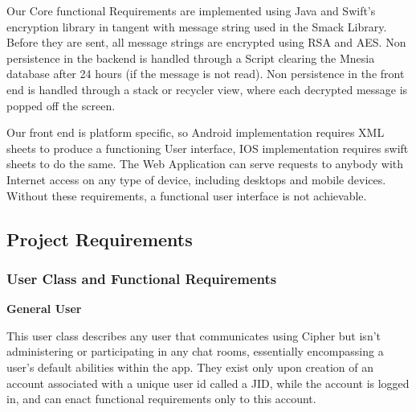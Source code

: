 \documentclass[12pt]{article}
\begin{document}
Our Core functional Requirements are implemented using Java and Swift’s encryption library in tangent with message string used in the Smack Library. Before they are sent, all message strings are encrypted using RSA and AES. Non persistence in the backend is handled through a Script clearing the Mnesia database after 24 hours (if the message is not read).  Non persistence in the front end is handled through a stack or recycler view, where each decrypted message is popped off the screen.

Our front end is platform specific, so Android implementation requires XML sheets to produce a functioning User interface, IOS implementation requires swift sheets to do the same. The Web Application can serve requests to anybody with Internet access on any type of device, including desktops and mobile devices. Without these requirements, a functional user interface is not achievable.
\hspace{0.5cm}

\subsection{\RaggedRight Project Requirements}\label{sec:requirements}
\subsubsection{User Class and Functional Requirements}
\textbf{General User}

This user class describes any user that communicates using Cipher but isn't administering or participating in any chat rooms, essentially encompassing a user’s default abilities within the app. They exist only upon creation of an account associated with a unique user id called a JID, while the account is logged in, and can enact functional requirements only to this account.
\end{document}
